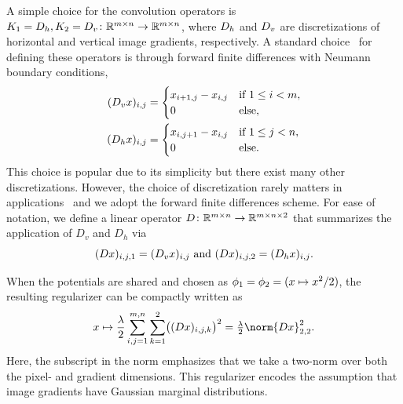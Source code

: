 A simple choice for the convolution operators is \( K_{\num{1}} = D_h, K_{\num{2}} = D_v \colon \mathbb{R}^{m \times n} \to \mathbb{R}^{m \times n} \), where \( D_h \) and \( D_v \) are discretizations of horizontal and vertical image gradients, respectively.
A standard choice~\cite{chambolle_algorithm_2004,chambolle_primal_2010,chambolle_pock_2016_acta_numerica} for defining these operators is through forward finite differences with Neumann boundary conditions,
\begin{equation}
	\begin{aligned}
		(D_v x)_{i, j} &= \begin{cases}
			x_{i + \num{1},j} - x_{i,j} & \text{if } \num{1} \leq i < m, \\
			0 & \text{else},
		\end{cases}\\
		(D_h x)_{i, j} &= \begin{cases}
			x_{i,j + \num{1}} - x_{i,j} & \text{if } \num{1} \leq j < n, \\
			0 & \text{else}.
		\end{cases}
	\end{aligned}
\end{equation}
This choice is popular due to its simplicity but there exist many other discretizations.
However, the choice of discretization rarely matters in applications~\cite{chambolle_upwind_2011} and we adopt the forward finite differences scheme.
For ease of notation, we define a linear operator \( D \colon \mathbb{R}^{m \times n} \to \mathbb{R}^{m \times n \times \num{2}} \) that summarizes the application of \( D_v \) and \( D_h \) via
\begin{equation}
	(D x)_{i, j, \num{1}} = (D_v x)_{i, j}\ \text{and}\ (D x)_{i, j, \num{2}} = (D_h x)_{i, j}.
\end{equation}

When the potentials are shared and chosen as \( \phi_{\num{1}} = \phi_{\num{2}} = (x \mapsto x^{\num{2}}/{\num{2}}) \), the resulting regularizer can be compactly written as
\begin{equation}
	x \mapsto \frac{\lambda}{2} \sum_{i,j=\num{1}}^{\Height,\Width} \sum_{k=\num{1}}^{\num{2}} \bigl( (\DiffOp x)_{i,j,k} \bigr)^{\num{2}} = \tfrac{\lambda}{2} \norm{Dx}_{\num{2}, \num{2}}^{\num{2}}.
	\label{eq:quadratic gradient penalization}
\end{equation}
Here, the subscript in the norm emphasizes that we take a two-norm over both the pixel- and gradient dimensions.
This regularizer encodes the assumption that image gradients have Gaussian marginal distributions.

